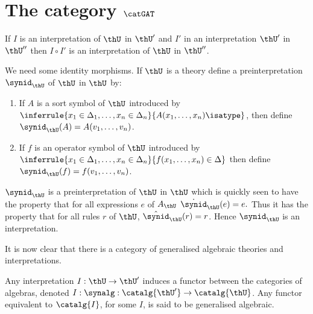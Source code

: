   \lipsum[12]

  \section{The category $\catGAT$} \label{sec:source-1-14}

  \lipsum[13]

  \begin{corollary}[5]
    If $I$ is an interpretation of $\thU$ in $\thU'$ and $I'$ in an interpretation $\thU'$ in $\thU''$ then $I\circ I'$ is an interpretation of $\thU$ in $\thU''$.
  \end{corollary}

  We need some identity morphisms.
  If $\thU$ is a theory define a preinterpretation $\synid_\thU$ of $\thU$ in $\thU$ by:
  \begin{enumerate}
    \item If $A$ is a sort symbol of $\thU$ introduced by $\inferrule{x_1\in\Delta_1,\ldots,x_n\in\Delta_n}{A(x_1,\ldots,x_n)\isatype}$, then define $\synid_\thU(A)=A(v_1,\ldots,v_n)$.
    \item If $f$ is an operator symbol of $\thU$ introduced by $\inferrule{x_1\in\Delta_1,\ldots,x_n\in\Delta_n}{f(x_1,\ldots,x_n)\in\Delta}$ then define $\synid_\thU(f)=f(v_1,\ldots,v_n)$.
  \end{enumerate}

  $\synid_\thU$ is a preinterpretation of $\thU$ in $\thU$ which is quickly seen to have the property that for all expressions $e$ of $A_\thU$ $\dot \synid_\thU(e)=e.$
  Thus it has the property that for all rules $r$ of $\thU$, $\hat\synid_\thU(r)=r$.
  Hence $\synid_\thU$ is an interpretation.

  It is now clear that there is a category of generalised algebraic theories and interpretations.

  Any interpretation $I:\thU\to\thU'$ induces a functor between the categories of algebras, denoted $I:\synalg: \catalg{\thU'}\to\catalg{\thU}$.
  Any functor equivalent to $\catalg{I}$, for some $I$, is said to be generalised algebraic.

